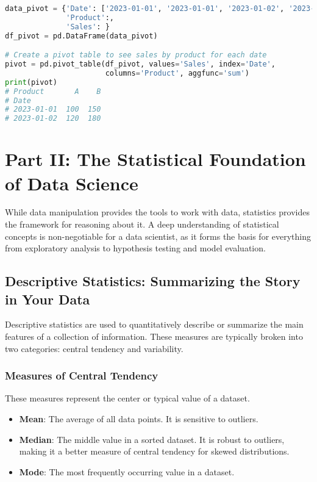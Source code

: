 \documentclass[11pt,a4paper]{article}
\begin{document}
\begin{lstlisting}[language=Python]
data_pivot = {'Date': ['2023-01-01', '2023-01-01', '2023-01-02', '2023-01-02'],
              'Product':,
              'Sales': }
df_pivot = pd.DataFrame(data_pivot)

# Create a pivot table to see sales by product for each date
pivot = pd.pivot_table(df_pivot, values='Sales', index='Date', 
                       columns='Product', aggfunc='sum')
print(pivot)
# Product       A    B
# Date
# 2023-01-01  100  150
# 2023-01-02  120  180
\end{lstlisting}

\section{Part II: The Statistical Foundation of Data Science}

While data manipulation provides the tools to work with data, statistics provides the framework for reasoning about it. A deep understanding of statistical concepts is non-negotiable for a data scientist, as it forms the basis for everything from exploratory analysis to hypothesis testing and model evaluation.

\subsection{Descriptive Statistics: Summarizing the Story in Your Data}

Descriptive statistics are used to quantitatively describe or summarize the main features of a collection of information. These measures are typically broken into two categories: central tendency and variability.

\subsubsection{Measures of Central Tendency}

These measures represent the center or typical value of a dataset.
\begin{itemize}
    \item \textbf{Mean}: The average of all data points. It is sensitive to outliers.
    \item \textbf{Median}: The middle value in a sorted dataset. It is robust to outliers, making it a better measure of central tendency for skewed distributions.
    \item \textbf{Mode}: The most frequently occurring value in a dataset.
\end{itemize}
\end{document}
